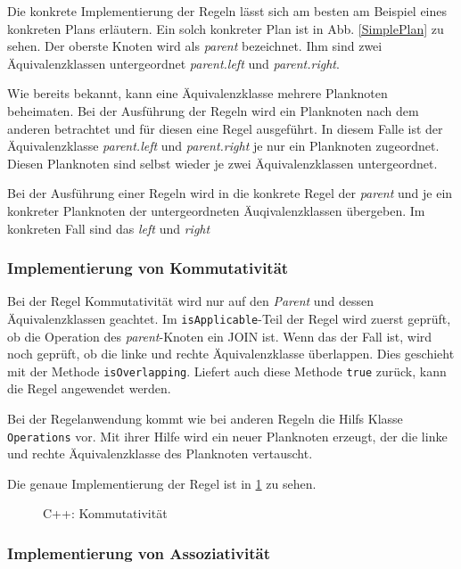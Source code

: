 Die konkrete Implementierung der Regeln lässt sich am besten am Beispiel eines konkreten Plans erläutern. Ein solch konkreter Plan ist in Abb. \ref{SimplePlan} zu sehen. Der oberste Knoten wird als \textit{parent} bezeichnet. Ihm sind zwei Äquivalenzklassen untergeordnet \textit{parent.left} und \textit{parent.right}. 

Wie bereits bekannt, kann eine Äquivalenzklasse mehrere Planknoten beheimaten. Bei der Ausführung der Regeln wird ein Planknoten nach dem anderen betrachtet und für diesen eine Regel ausgeführt. In diesem Falle ist der Äquivalenzklasse \textit{parent.left} und \textit{parent.right} je nur ein Planknoten zugeordnet. Diesen Planknoten sind selbst wieder je zwei Äquivalenzklassen untergeordnet.


Bei der Ausführung einer Regeln wird in die konkrete Regel der \textit{parent} und je ein konkreter Planknoten der untergeordneten Äuqivalenzklassen übergeben. Im konkreten Fall sind das \textit{left} und \textit{right}





\subsubsection{Implementierung von Kommutativität}

Bei der Regel Kommutativität wird nur auf den \textit{Parent} und dessen Äquivalenzklassen geachtet. Im \texttt{isApplicable}-Teil der Regel wird zuerst geprüft, ob die Operation des \textit{parent}-Knoten ein JOIN ist. Wenn das der Fall ist, wird noch geprüft, ob die linke und rechte Äquivalenzklasse überlappen. Dies geschieht mit der Methode \texttt{isOverlapping}. Liefert auch diese Methode \texttt{true} zurück, kann die Regel angewendet werden.

Bei der Regelanwendung kommt wie bei anderen Regeln die Hilfs Klasse \texttt{Operations} vor. Mit ihrer Hilfe wird ein neuer Planknoten erzeugt, der die linke und rechte Äquivalenzklasse des Planknoten vertauscht.

Die genaue Implementierung der Regel ist in \ref{CommutativityCode} zu sehen.


\begin{figure}[ht]

\caption{C++: Kommutativität}
\label{CommutativityCode}
\end{figure}




\subsubsection{Implementierung von Assoziativität}

